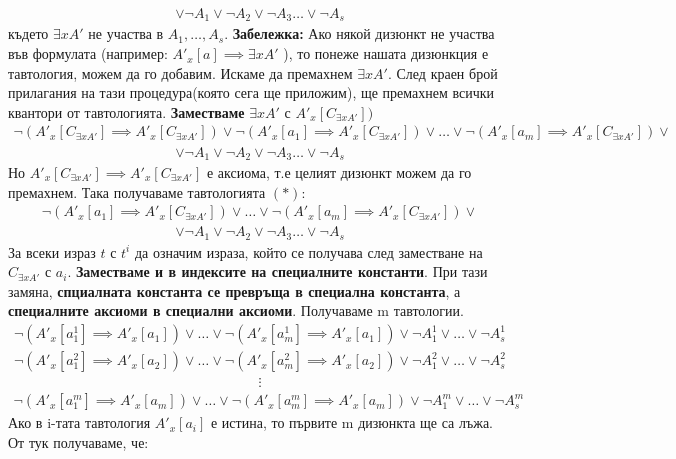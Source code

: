 \documentclass[french]{article}
\begin{document}
\begin{align*}
\lor \neg A_1 \lor \neg A_2 \lor \neg A_3 \dots \lor \neg A_s
\end{align*}
където $\exists x A'$ не участва в $A_1, \dots, A_s$. 
\newline
\textbf{Забележка:} Ако някой дизюнкт не участва във формулата \newline (например: $A'_x[a] \implies \exists x A'$ ), то понеже нашата дизюнкция е тавтология, можем да го добавим. \newline
Искаме да премахнем $\exists x A'$. След краен брой прилагания на тази процедура(която сега ще приложим), ще премахнем всички квантори от тавтологията. \newline \newline
\textbf{Заместваме} $\exists x A'$ с  $A'_x[C_{\exists x A'}])$
\begin{align*}
\neg ( A'_x[C_{\exists x A'}] \implies A'_x[C_{\exists x A'}]) \lor 	\neg (A'_x[a_1] \implies A'_x[C_{\exists x A'}]) \lor \dots 	\lor \neg(A'_x[a_m] \implies A'_x[C_{\exists x A'}])  \lor 
\end{align*}
\begin{align*}
\lor \neg A_1 \lor \neg A_2 \lor \neg A_3 \dots \lor \neg A_s
\end{align*}
Но $A'_x[C_{\exists x A'}] \implies A'_x[C_{\exists x A'}]$ е аксиома, т.е целият дизюнкт можем да го премахнем. Така получаваме тавтологията $(*)$:
\begin{align*}\neg (A'_x[a_1] \implies A'_x[C_{\exists x A'}]) \lor \dots 	\lor \neg(A'_x[a_m] \implies A'_x[C_{\exists x A'}])  \lor 
\end{align*}
\begin{align*}
\lor \neg A_1 \lor \neg A_2 \lor \neg A_3 \dots \lor \neg A_s
\end{align*}
За всеки израз $t$ с $t^i$ да означим израза, който се получава след заместване на $C_{\exists x A'}$ с $a_i$. \textbf{Заместваме и в индексите на специалните константи}. \newline
При тази замяна, \textbf{спциалната константа се превръща в специална константа}, а \textbf{специалните аксиоми в специални аксиоми}. \newline
Получаваме m тавтологии.
\begin{align*}
\neg (A'_x[a_1^1] \implies A'_x[a_1]) \lor \dots 	\lor \neg(A'_x[a_m^1] \implies A'_x[a_1])  \lor \neg A_1^1 \lor  \dots \lor  \neg A_s^1
\end{align*}
\begin{align*}
\neg (A'_x[a_1^2] \implies A'_x[a_2]) \lor \dots 	\lor \neg(A'_x[a_m^2] \implies A'_x[a_2])  \lor \neg A_1^2 \lor \dots \lor \neg A_s^2
\end{align*}
\begin{align*}
\vdots
\end{align*}
\begin{align*}
\neg (A'_x[a_1^m] \implies A'_x[a_m]) \lor \dots 	\lor \neg(A'_x[a_m^m] \implies A'_x[a_m])  \lor \neg A_1^m \lor  \dots \lor  \neg A_s^m
\end{align*}
Ако в i-тата тавтология $A'_x[a_i]$ е истина, то първите m дизюнкта ще са лъжа. От тук получаваме, че:
\end{document}
